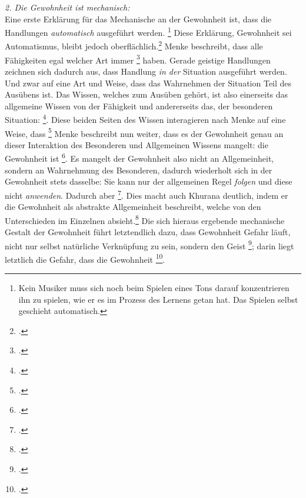 \documentclass[12pt, a4paper, openany]{report}
\begin{document}
\emph{2. Die Gewohnheit ist mechanisch:}\\
Eine erste Erklärung für das Mechanische an der Gewohnheit ist, dass die Handlungen \emph{automatisch} ausgeführt werden.%
\footnote{
    Kein Musiker muss sich noch beim Spielen eines Tons darauf konzentrieren ihn zu spielen, wie er es im Prozess des Lernens getan hat. 
    Das Spielen selbst geschieht automatisch.
}
Diese Erklärung, Gewohnheit sei Automatismus, bleibt jedoch oberflächlich.\footcite[Vgl.][132]{menke_autonomie_2018}
Menke beschreibt, dass alle Fähigkeiten egal welcher Art immer \footcite[][132]{menke_autonomie_2018} haben. 
Gerade geistige Handlungen zeichnen sich dadurch aus, dass Handlung \emph{in der} Situation ausgeführt werden.
Und zwar auf eine Art und Weise, dass das Wahrnehmen der Situation Teil des Ausübens ist. 
Das Wissen, welches zum Ausüben gehört, ist also einerseits das allgemeine Wissen von der Fähigkeit und andererseits das, der besonderen Situation: \footcite[][133]{menke_autonomie_2018}.
Diese beiden Seiten des Wissen interagieren nach Menke auf eine Weise, dass \footcite[][133]{menke_autonomie_2018}
Menke beschreibt nun weiter, dass es der Gewohnheit genau an dieser Interaktion des Besonderen und Allgemeinen Wissens mangelt:
die Gewohnheit ist \footcite[][§ 410 Z, S. 188]{hegel_enzyklopädie_1969}.
Es mangelt der Gewohnheit also nicht an Allgemeinheit, sondern an Wahrnehmung des Besonderen, dadurch wiederholt sich in der Gewohnheit stets dasselbe:
Sie kann nur der allgemeinen Regel \emph{folgen} und diese nicht \emph{anwenden}. 
Dadurch aber \footcite[][134]{menke_autonomie_2018}.
Dies macht auch Khurana deutlich, indem er die Gewohnheit als abstrakte Allgemeinheit beschreibt, welche von den Unterschieden im Einzelnen absieht.\footcite[Vgl.][431]{khurana_freiheit_2017}
Die sich hieraus ergebende mechanische Gestalt der Gewohnheit führt letztendlich dazu, dass Gewohnheit Gefahr läuft, nicht nur selbst natürliche Verknüpfung zu sein, sondern den Geist \footcite[][430]{khurana_freiheit_2017};
darin liegt letztlich die Gefahr, dass die Gewohnheit \footcite[189]{khurana_freiheit_2017}.
\end{document}
